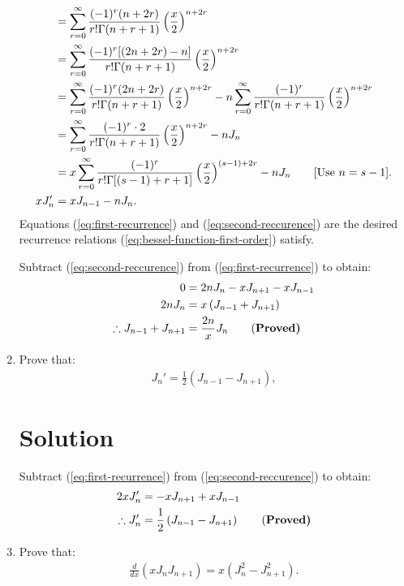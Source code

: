 \begin{enumerate}
\begin{align}
    &=\sum_{r=0}^\infty\frac{(-1)^r(n+2r)}{r!\Gamma(n+r+1)}\left(\frac{x}{2}\right)^{n+2r}\notag\notag\\
    &=\sum_{r=0}^\infty\frac{(-1)^r[(2n+2r)-n]}{r!\Gamma(n+r+1)}\left(\frac{x}{2}\right)^{n+2r}\notag\\
    &=\sum_{r=0}^\infty\frac{(-1)^r(2n+2r)}{r!\Gamma(n+r+1)}\left(\frac{x}{2}\right)^{n+2r}-n\sum_{r=0}^\infty\frac{(-1)^r}{r!\Gamma(n+r+1)}\left(\frac{x}{2}\right)^{n+2r}\notag\\
    &=\sum_{r=0}^\infty\frac{(-1)^r\cdot2}{r!\Gamma(n+r+1)}\left(\frac{x}{2}\right)^{n+2r}-nJ_n\notag\\
    &=x\sum_{r=0}^\infty\frac{(-1)^r}{r!\Gamma[(s-1)+r+1]}\left(\frac{x}{2}\right)^{(s-1)+2r}-nJ_n\qquad[\text{Use  }n=s-1].\notag\\
    xJ^{\prime}_n&=xJ_{n-1}-nJ_n.\label{eq:second-reccurence}
\end{align}
Equations (\ref{eq:first-recurrence}) and (\ref{eq:second-reccurence}) are the desired recurrence relations (\ref{eq:bessel-function-first-order}) satisfy.

Subtract (\ref{eq:second-reccurence}) from (\ref{eq:first-recurrence}) to obtain:
\begin{align}
    0& = 2nJ_n - xJ_{n+1} - xJ_{n-1}\notag\\
    2nJ_n&=x\left(J_{n-1}+J_{n+1}\right)\notag\\
    \therefore J_{n-1} + J_{n+1} &= \frac{2n}{x} J_n\qquad\text{(\bf Proved)}
\end{align}
\bigskip\bigskip\hline\hline\bigskip
\item Prove that:
\begin{align*}
    J_n' = \frac{1}{2} \left(J_{n-1} - J_{n+1}\right),
\end{align*}
\bigskip\bigskip\hline\hline\bigskip
\section*{Solution}
Subtract (\ref{eq:first-recurrence}) from (\ref{eq:second-reccurence}) to obtain:
\begin{align}
    2xJ^{\prime}_n & = - xJ_{n+1} + xJ_{n-1}\notag\\
    \therefore J_n' &= \frac{1}{2} \left(J_{n-1} - J_{n+1}\right)\qquad\text{(\bf Proved)}
\end{align}
\bigskip\bigskip\hline\hline\bigskip
\item Prove that:
\begin{align*}
    \frac{d}{dx}\left( x J_n J_{n+1} \right) = x \left( J_n^2 - J_{n+1}^2 \right).
\end{align*}
\bigskip\bigskip\hline\hline\bigskip

\end{enumerate}
